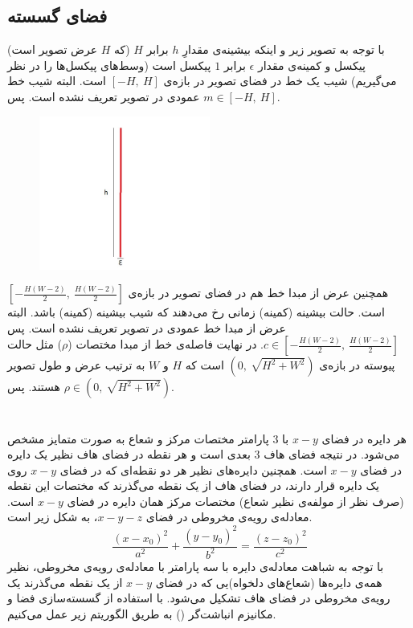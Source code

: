 \documentclass{article}
\begin{document}
\subsection{فضای گسسته}
با توجه به تصویر زیر و اینکه بیشینه‌ی مقدارِ $h$ برابر $H$ (که $H$ عرض تصویر است) پیکسل و کمینه‌ی مقدار $\epsilon$ برابر $1$ پیکسل است (وسط‌های پیکسل‌ها را در نظر می‌گیریم) شیب یک خط در فضای تصویر در بازه‌ی $\left[ -H ,\: H \right]$ است. البته شیب خط عمودی در تصویر تعریف نشده است. پس 
$
m \in \left[ -H ,\: H \right]
$.
\begin{figure}[H]
    \centering
    \includegraphics[width=0.5\textwidth]{figures/4.jpg}
    \caption
	{}
    \label{fig:fig1}
\end{figure}

همچنین عرض از مبدا خط هم در فضای تصویر در بازه‌ی $\left[ -\frac{H(W-2)}{2} ,\: \frac{H(W-2)}{2} \right]$ است. حالت بیشینه (کمینه) زمانی رخ می‌دهند که شیب بیشینه (کمینه) باشد. البته عرض از مبدا خط عمودی در تصویر تعریف نشده است. پس 
$
c \in \left[ -\frac{H(W-2)}{2} ,\: \frac{H(W-2)}{2} \right]
$.
در نهایت فاصله‌ی خط از مبدا مختصات ($\rho$) مثل حالت پیوسته در بازه‌ی $\left( 0 ,\: \sqrt{H^2 + W^2} \right)$ است که $H$ و $W$ به ترتیب عرض و طول تصویر هستند. پس 
$
\rho \in \left( 0 ,\: \sqrt{H^2 + W^2} \right)
$.


\section{}%
هر دایره در فضای $x-y$ با 3 پارامتر مختصات مرکز و شعاع به صورت متمایز مشخص می‌شود. در نتیجه فضای هاف 3 بعدی است و هر نقطه در فضای هاف نظیر یک دایره در فضای $x-y$ است. همچنین دایره‌های نظیر هر دو نقطه‌ای که در فضای $x-y$ روی یک دایره قرار دارند، در فضای هاف از یک نقطه می‌گذرند که مختصات این نقطه (صرف نظر از مولفه‌ی نظیر شعاع) مختصات مرکز همان دایره در فضای $x-y$ است. معادله‌ی رویه‌ی مخروطی در فضای $x-y-z$، به شکل زیر است.
\newline
$$
\frac{(x-x_{0})^2}{a^2} + \frac{(y-y_{0})^2}{b^2} = \frac{(z-z_{0})^2}{c^2}
$$
با توجه به شباهت معادله‌ی دایره با سه پارامتر با معادله‌ی رویه‌ی مخروطی، نظیر همه‌ی دایره‌ها (شعاع‌های دلخواه)یی که در فضای $x-y$ از یک نقطه می‌گذرند یک رویه‌ی مخروطی در فضای هاف تشکیل می‌شود.
با استفاده از گسسته‌سازی فضا و مکانیزم انباشت‌گر () به طریق الگوریتم زیر عمل می‌کنیم.
\end{document}
